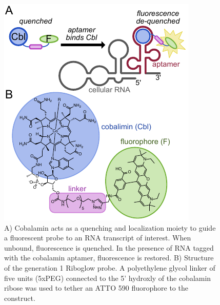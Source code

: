 \begin{figure}
\begin{centering}
\includegraphics[width=\textwidth]{figures/fig1v2.pdf}

\end{centering}
\footnotesize
\caption{\label{figure:riboglow}
A) Cobalamin acts as a quenching and localization moiety to guide a fluorescent probe to an RNA transcript of interest. When unbound, fluorescence is quenched. In the presence of RNA tagged with the cobalamin aptamer, fluorescence is restored. B) Structure of the generation 1 Riboglow probe. A polyethylene glycol linker of five units (5xPEG) connected to the 5' hydroxly of the cobalamin ribose was used to tether an ATTO 590 fluorophore to the construct.
}
\end{figure}

